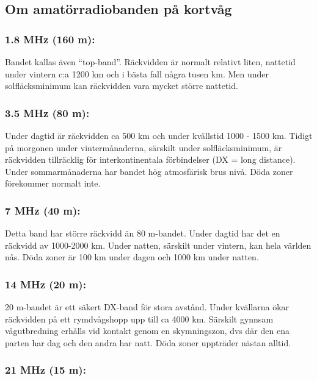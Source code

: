 \subsection{Om amatörradiobanden på kortvåg}

\subsubsection{1.8 MHz (160 m):}

Bandet kallas även ``top-band''. Räckvidden är normalt relativt liten,
nattetid under vintern c:a 1200 km och i bästa fall några tusen km.
Men under solfläcksminimum kan räckvidden vara mycket större nattetid.

\subsubsection{3.5 MHz (80 m):}

Under dagtid är räckvidden ca 500 km och under kvällstid 1000 - 1500
km. Tidigt på morgonen under vintermånaderna, särskilt under
solfläcksminimum, är räckvidden tillräcklig för interkontinentala
förbindelser (DX = long distance). Under sommarmånaderna har bandet
hög atmosfärisk brus nivå. Döda zoner förekommer normalt inte.

\subsubsection{7 MHz (40 m):}

Detta band har större räckvidd än 80 m-bandet. Under dagtid har det en
räckvidd av 1000-2000 km. Under natten, särskilt under vintern, kan
hela världen nås. Döda zoner är 100 km under dagen och 1000 km under
natten.

\subsubsection{14 MHz (20 m):}

20 m-bandet är ett säkert DX-band för stora avstånd. Under kvällarna
ökar räckvidden på ett rymdvågshopp upp till ca 4000 km.  Särskilt
gynnsam vågutbredning erhålls vid kontakt genom en skymningszon, dvs
där den ena parten har dag och den andra har natt. Döda zoner
uppträder nästan alltid.

\subsubsection{21 MHz (15 m):}

